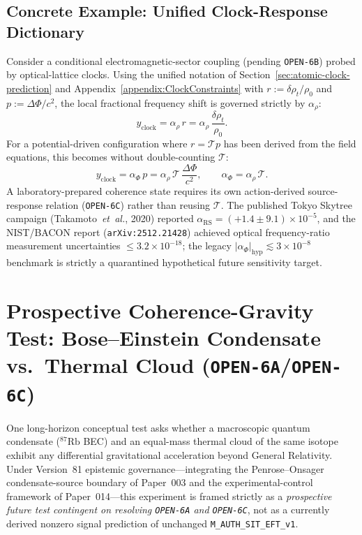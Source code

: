 \subsection{Concrete Example: Unified Clock-Response Dictionary}

Consider a conditional electromagnetic-sector coupling (pending \texttt{OPEN-6B}) probed by optical-lattice clocks. Using the unified notation of Section~\ref{sec:atomic-clock-prediction} and Appendix~\ref{appendix:ClockConstraints} with $r := \delta\rho_t/\rho_0$ and $p := \Delta\Phi/c^2$, the local fractional frequency shift is governed strictly by $\alpha_\rho$:
\[
y_{\mathrm{clock}} = \alpha_\rho\,r = \alpha_\rho\,\frac{\delta\rho_t}{\rho_0}.
\]
For a potential-driven configuration where $r = \mathcal{T} p$ has been derived from the field equations, this becomes without double-counting $\mathcal{T}$:
\[
y_{\mathrm{clock}} = \alpha_\Phi\,p = \alpha_\rho\,\mathcal{T}\,\frac{\Delta\Phi}{c^2},
\qquad
\alpha_\Phi = \alpha_\rho\,\mathcal{T}.
\]
A laboratory-prepared coherence state requires its own action-derived source-response relation (\texttt{OPEN-6C}) rather than reusing $\mathcal{T}$. The published Tokyo Skytree campaign (Takamoto~\emph{et~al.}, 2020) reported $\alpha_{\mathrm{RS}} = (+1.4 \pm 9.1)\times 10^{-5}$, and the NIST/BACON report (\texttt{arXiv:2512.21428}) achieved optical frequency-ratio measurement uncertainties $\le 3.2\times 10^{-18}$; the legacy $|\alpha_\Phi|_{\mathrm{hyp}} \lesssim 3 \times 10^{-8}$ benchmark is strictly a quarantined hypothetical future sensitivity target.

\section{Prospective Coherence-Gravity Test: Bose--Einstein Condensate vs.\ Thermal Cloud (\texttt{OPEN-6A}/\texttt{OPEN-6C})}
\label{sec:smoking-gun-bec}
\label{sec:bec_smoking_gun}

One long-horizon conceptual test asks whether a macroscopic quantum condensate ($^{87}\mathrm{Rb}$ BEC) and an equal-mass thermal cloud of the same isotope exhibit any differential gravitational acceleration beyond General Relativity. Under Version~81 epistemic governance---integrating the Penrose--Onsager condensate-source boundary of Paper~003 and the experimental-control framework of Paper~014---this experiment is framed strictly as a \emph{prospective future test contingent on resolving \texttt{OPEN-6A} and \texttt{OPEN-6C}}, not as a currently derived nonzero signal prediction of unchanged \texttt{M\_AUTH\_SIT\_EFT\_v1}.

